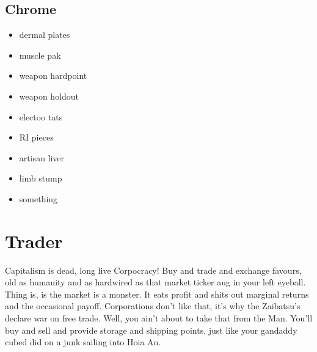\documentclass{tufte-book}
\begin{document}
\subsection{Chrome}
\begin{multicols}{3}
\begin{itemize}
\item dermal plates
\item muscle pak
\item weapon hardpoint
\item weapon holdout
\item electoo tats
\item RI pieces
\item artisan liver
\item limb stump
\item something
\end{itemize}
\end{multicols}




\section{Trader} \label{sec:Trader}

Capitalism is dead, long live Corpocracy! Buy and trade and exchange favours, old as humanity and as hardwired as that market ticker aug in your left eyeball. Thing is, is the market is a monster. It eats profit and shits out marginal returns and the occasional payoff. Corporations don't like that, it's why the Zaibatsu's declare war on free trade. Well, you ain't about to take that from the Man. You'll buy and sell and provide storage and shipping points, just like your gandaddy cubed did on a junk sailing into Hoia An.

\end{document}
